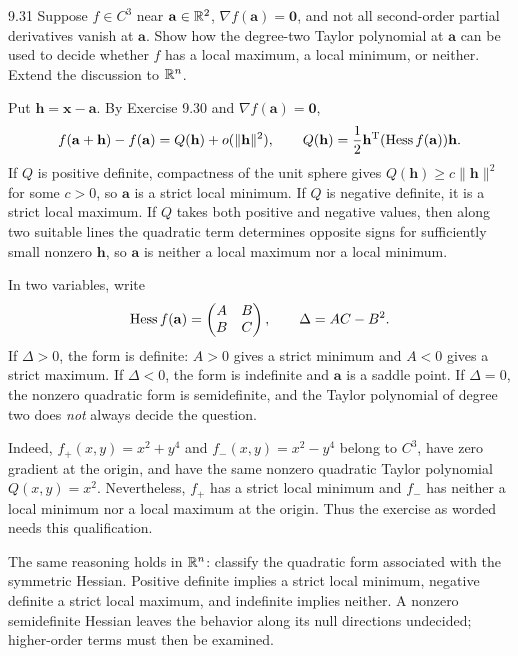 \documentclass[11pt,oneside]{article}
\begin{document}
\begin{exercise}{9.31}
Suppose $f\in C^3$ near $\mathbf a\in\mathbb{R}^2$, $\nabla f(\mathbf a)=\mathbf0$, and not all second-order partial derivatives vanish at $\mathbf a$. Show how the degree-two Taylor polynomial at $\mathbf a$ can be used to decide whether $f$ has a local maximum, a local minimum, or neither. Extend the discussion to $\mathbb{R}^n$.
\end{exercise}
\begin{solution}
Put $\mathbf h=\mathbf x-\mathbf a$. By Exercise 9.30 and $\nabla f(\mathbf a)=\mathbf0$,
\[
 f(\mathbf a+\mathbf h)-f(\mathbf a)=Q(\mathbf h)+o(\|\mathbf h\|^2),
 \qquad Q(\mathbf h)=\frac12\mathbf h^{\mathrm T}(\operatorname{Hess} f(\mathbf a))\mathbf h.
\]
If $Q$ is positive definite, compactness of the unit sphere gives $Q(\mathbf h)\ge c\|\mathbf h\|^2$ for some $c>0$, so $\mathbf a$ is a strict local minimum. If $Q$ is negative definite, it is a strict local maximum. If $Q$ takes both positive and negative values, then along two suitable lines the quadratic term determines opposite signs for sufficiently small nonzero $\mathbf h$, so $\mathbf a$ is neither a local maximum nor a local minimum.

In two variables, write
\[
 \operatorname{Hess} f(\mathbf a)=\begin{pmatrix}A&B\\B&C\end{pmatrix},
 \qquad\Delta=AC-B^2.
\]
If $\Delta>0$, the form is definite: $A>0$ gives a strict minimum and $A<0$ gives a strict maximum. If $\Delta<0$, the form is indefinite and $\mathbf a$ is a saddle point. If $\Delta=0$, the nonzero quadratic form is semidefinite, and the Taylor polynomial of degree two does \emph{not} always decide the question.

Indeed, $f_+(x,y)=x^2+y^4$ and $f_-(x,y)=x^2-y^4$ belong to $C^3$, have zero gradient at the origin, and have the same nonzero quadratic Taylor polynomial $Q(x,y)=x^2$. Nevertheless, $f_+$ has a strict local minimum and $f_-$ has neither a local minimum nor a local maximum at the origin. Thus the exercise as worded needs this qualification.

The same reasoning holds in $\mathbb{R}^n$: classify the quadratic form associated with the symmetric Hessian. Positive definite implies a strict local minimum, negative definite a strict local maximum, and indefinite implies neither. A nonzero semidefinite Hessian leaves the behavior along its null directions undecided; higher-order terms must then be examined.
\end{solution}
\end{document}
